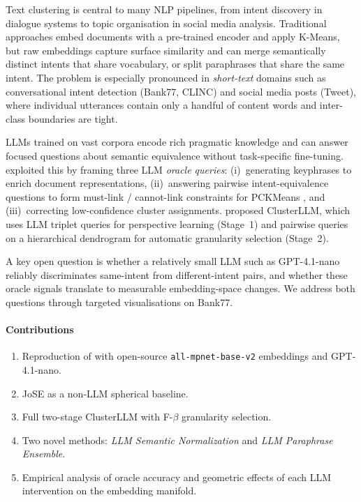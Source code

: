 \documentclass[10pt,twocolumn,a4paper]{article}
\begin{document}
Text clustering is central to many NLP pipelines, from intent discovery in
dialogue systems to topic organisation in social media analysis.
Traditional approaches embed documents with a pre-trained encoder and apply
K-Means, but raw embeddings capture surface similarity and can merge
semantically distinct intents that share vocabulary, or split paraphrases
that share the same intent.
The problem is especially pronounced in \emph{short-text} domains such as
conversational intent detection (Bank77, CLINC) and social media posts (Tweet),
where individual utterances contain only a handful of content words and
inter-class boundaries are tight.

LLMs trained on vast corpora encode rich pragmatic knowledge and can answer
focused questions about semantic equivalence without task-specific fine-tuning.
\citet{viswanathan2023large} exploited this by framing three LLM \emph{oracle
queries}: (i)~generating keyphrases to enrich document representations,
(ii)~answering pairwise intent-equivalence questions to form must-link /
cannot-link constraints for PCKMeans \citep{basu2004active}, and
(iii)~correcting low-confidence cluster assignments.
\citet{zhang2023clusterllm} proposed ClusterLLM, which uses LLM triplet queries
for perspective learning (Stage~1) and pairwise queries on a hierarchical
dendrogram for automatic granularity selection (Stage~2).

A key open question is whether a relatively small LLM such as GPT-4.1-nano
reliably discriminates same-intent from different-intent pairs, and whether
these oracle signals translate to measurable embedding-space changes.
We address both questions through targeted visualisations on Bank77.

\paragraph{Contributions}
\begin{enumerate}[leftmargin=1.2em, topsep=2pt, itemsep=1pt, parsep=0pt]
  \item Reproduction of \citet{viswanathan2023large} with open-source
    \texttt{all-mpnet-base-v2} embeddings and GPT-4.1-nano.
  \item JoSE \citep{meng2019spherical} as a non-LLM spherical baseline.
  \item Full two-stage ClusterLLM \citep{zhang2023clusterllm} with
    F-$\beta$ granularity selection.
  \item Two novel methods: \emph{LLM Semantic Normalization} and
    \emph{LLM Paraphrase Ensemble}.
  \item Empirical analysis of oracle accuracy and geometric effects of each
    LLM intervention on the embedding manifold.
\end{enumerate}
\end{document}
